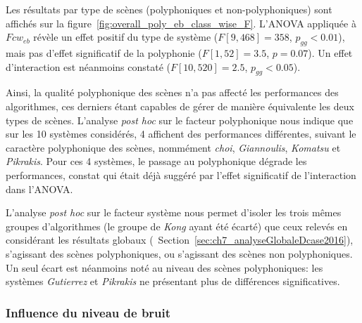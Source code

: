 Les résultats par type de scènes (polyphoniques et non-polyphoniques) sont affichés sur la figure~\ref{fig:overall_poly_eb_class_wise_F}. L'ANOVA appliquée à $Fcw_{eb}$ révèle un effet positif du type de système ($F[9,468]=358$, $p_{gg}<0.01$), mais pas d'effet significatif de la polyphonie ($F[1,52]=3.5$, $p=0.07$). Un effet d'interaction est néanmoins constaté ($F[10,520]=2.5$, $p_{gg}<0.05$).

Ainsi, la qualité polyphonique des scènes n'a pas affecté les performances des algorithmes, ces derniers étant capables de gérer de manière équivalente les deux types de scènes. L'analyse \emph{post hoc} sur le facteur polyphonique nous indique que sur les 10 systèmes considérés, 4 affichent des performances différentes, suivant le caractère polyphonique des scènes, nommément \emph{choi}, \emph{Giannoulis}, \emph{Komatsu} et \emph{Pikrakis}. Pour ces 4 systèmes, le passage au polyphonique dégrade les performances, constat qui était déjà suggéré par l'effet significatif de l'interaction dans l'ANOVA.

L'analyse \emph{post hoc} sur le facteur système nous permet d'isoler les trois mêmes groupes d'algorithmes (le groupe de \emph{Kong} ayant été écarté) que ceux relevés en considérant les résultats globaux (\cf~Section~\ref{sec:ch7_analyseGlobaleDcase2016}), s'agissant des scènes polyphoniques, ou s'agissant des scènes non polyphoniques. Un seul écart est néanmoins noté au niveau des scènes polyphoniques: les systèmes \emph{Gutierrez} et \emph{Pikrakis} ne présentant plus de différences significatives.

\subsubsection{Influence du niveau de bruit}

